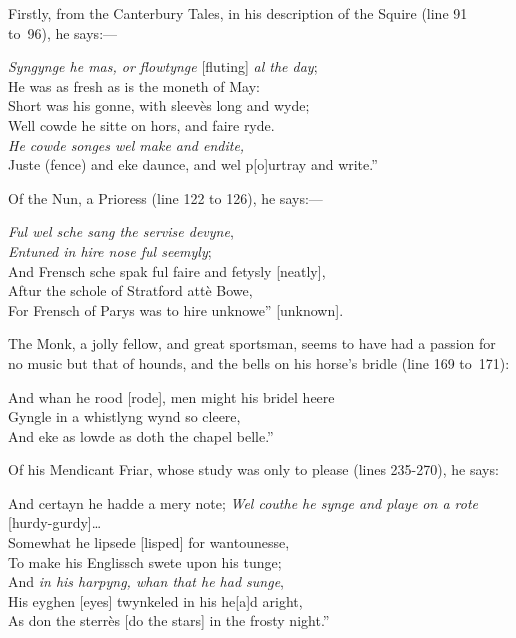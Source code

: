 Firstly, from the Canterbury Tales, in his description of the Squire (line 91
to~96), he says:—
\begin{scverse}\textit{Syngynge he mas, or flowtynge} [fluting] \textit{al the day};\\
He was as fresh as is the moneth of May:\\
Short was his gonne, with sleevès long and wyde;\\
Well cowde he sitte on hors, and faire ryde.\\
\textit{He cowde songes wel make and endite,}\\
Juste (fence) and eke daunce, and wel p[o]urtray and write.”
\end{scverse}

Of the Nun, a Prioress (line 122 to 126), he says:—
\begin{scverse}\textit{Ful wel sche sang the servise devyne},\\
\textit{Entuned in hire nose ful seemyly};\\
And Frensch sche spak ful faire and fetysly [neatly],\\
Aftur the schole of Stratford attè Bowe,\\
For Frensch of Parys was to hire unknowe” [unknown].
\end{scverse}

The Monk, a jolly fellow, and great sportsman, seems to have had a passion for
no music but that of hounds, and the bells on his horse’s bridle (line 169 to~171):
\begin{scverse}And whan he rood [rode], men might his bridel heere\\
Gyngle in a whistlyng wynd so cleere,\\
And eke as lowde as doth the chapel belle.”
\end{scverse}

Of his Mendicant Friar, whose study was only to please (lines 235-270),
he says:
\begin{scverse}And certayn he hadde a mery note;
\textit{Wel couthe he synge and playe on a rote }[hurdy-gurdy]\ldots \\
Somewhat he lipsede [lisped] for wantounesse,\\
To make his Englissch swete upon his tunge;\\
And \textit{in his harpyng, whan that he had sunge},\\
His eyghen [eyes] twynkeled in his he[a]d aright,\\
As don the sterrès [do the stars] in the frosty night.”
\end{scverse}

